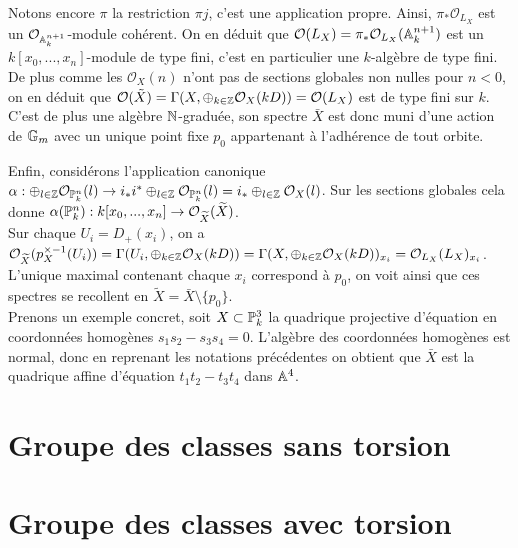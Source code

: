 Notons encore $\pi$ la restriction $\pi j$, c'est une application propre. Ainsi, $\pi_*\mathcal{O}_{L_X}$ est un $\mathcal{O}_{\mathbb{A}_k^{n+1}}$-module cohérent. On en déduit que $\mathcal{O}(L_X)=\pi_*\mathcal{O}_{L_X}(\mathbb{A}_k^{n+1})$ est un $k[x_0,...,x_n]$-module de type fini, c'est en particulier une $k$-algèbre de type fini. De plus comme les $\mathcal{O}_X(n)$ n'ont pas de sections globales non nulles pour $n<0$, on en déduit que $\mathcal{O}(\tilde{X})=\Gamma(X,\oplus_{k\in \mathbb{Z}}\mathcal{O}_X(kD))=\mathcal{O}(L_X)$ est de type fini sur $k$. C'est de plus une algèbre $\mathbb{N}$-graduée, son spectre $\bar{X}$ est donc muni d'une action de $\mathbb{G}_m$ avec un unique point fixe $p_0$ appartenant à l'adhérence de tout orbite. 

Enfin, considérons l'application canonique $\alpha: \oplus_{l\in\mathbb{Z}}\mathcal{O}_{\mathbb{P}^n_k}(l)\rightarrow i_*i^*\oplus_{l\in \mathbb{Z}}\mathcal{O}_{\mathbb{P}^n_k}(l)=i_*\oplus_{l\in \mathbb{Z}}\mathcal{O}_X(l)$. Sur les sections globales cela donne $\alpha(\mathbb{P}^n_k): k[x_0,...,x_n]\rightarrow \mathcal{O}_{\widetilde{X}}(\widetilde{X})$.\\
Sur chaque $U_i=D_+(x_i)$, on a $\mathcal{O}_{\widetilde{X}}(p_X^{\times-1}(U_i))=\Gamma(U_i,\oplus_{k\in \mathbb{Z}}\mathcal{O}_X(kD))=\Gamma(X,\oplus_{k\in \mathbb{Z}}\mathcal{O}_X(kD))_{x_i}=\mathcal{O}_{L_X}(L_X)_{x_i}$. L'unique maximal contenant chaque $x_i$ correspond à $p_0$, on voit ainsi que ces spectres se recollent en $\widetilde{X}=\bar{X}\setminus \lbrace p_0 \rbrace$.\\

Prenons un exemple concret, soit $X\subset \mathbb{P}^3_k$ la quadrique projective d'équation en coordonnées homogènes $s_1s_2-s_3s_4=0$. L'algèbre des coordonnées homogènes est normal, donc en reprenant les notations précédentes on obtient que $\bar{X}$ est la quadrique affine d'équation $t_1t_2-t_3t_4$ dans $\mathbb{A}^4$.

\section{Groupe des classes sans torsion}


\section{Groupe des classes avec torsion}
